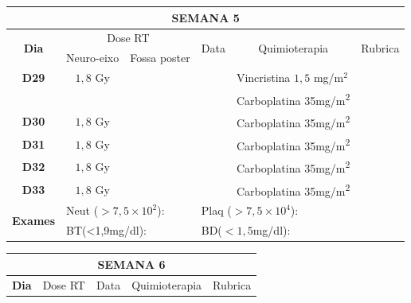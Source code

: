 \documentclass[11pt,a4paper,oldfontcommands]{memoir}
\begin{document}
\begin{center}
\begin{table}[H]
\begin{tabular}{p{1cm}p{2cm}|p{2cm}|p{1cm}|p{4cm}|p{3cm}}
	\hline
	\multicolumn{6}{c}{\textbf{SEMANA 5}}\\
\hline
    \multicolumn{1}{c|}{\multirow{2}{*}{\textbf{Dia}}}&\multicolumn{2}{c|}{Dose RT}&\multicolumn{1}{c|}{\multirow{2}{*}{Data}}&\multicolumn{1}{c|}{\multirow{2}{*}{Quimioterapia}}&\multicolumn{1}{c}{\multirow{2}{*}{Rubrica}} \\
    \cline{2-3}
    \multicolumn{1}{c|}{\multirow{1}{*}{}}&{Neuro-eixo}&{Fossa poster}&& \\
	\hline
	\multicolumn{1}{c|}{\multirow{1}{*}{\textbf{D29}}}&\multicolumn{1}{c|}{\(1,8\) Gy}&&&{Vincristina \(1,5\) mg/m\(^2\)}&\\
	\multicolumn{1}{c|}{\multirow{1}{*}{\textbf{}}}&\multicolumn{1}{c|}{}&&&{Carboplatina 35mg/m\textsuperscript{2}}&\\
    \multicolumn{1}{c|}{\multirow{1}{*}{\textbf{D30}}}&\multicolumn{1}{c|}{\(1,8\) Gy}&&&{Carboplatina 35mg/m\textsuperscript{2}}&\\
    \multicolumn{1}{c|}{\multirow{1}{*}{\textbf{D31}}}&\multicolumn{1}{c|}{\(1,8\) Gy}&&&{Carboplatina 35mg/m\textsuperscript{2}}&\\
    \multicolumn{1}{c|}{\multirow{1}{*}{\textbf{D32}}}&\multicolumn{1}{c|}{\(1,8\) Gy}&&&{Carboplatina 35mg/m\textsuperscript{2}}&\\
    \multicolumn{1}{c|}{\multirow{1}{*}{\textbf{D33}}}&\multicolumn{1}{c|}{\(1,8\) Gy}&&&{Carboplatina 35mg/m\textsuperscript{2}}&\\
    \hline
    \multicolumn{1}{c|}{\multirow{2}{*}{\textbf{Exames}}}&\multicolumn{2}{l|}{Neut (\(>7,5\times10^2\)):}&\multicolumn{2}{l|}{Plaq (\(>7,5\times10^4\)):}&\\
    \cline{2-6}
    \multicolumn{1}{c|}{\multirow{2}{*}{{}}}&\multicolumn{2}{l|}{BT(<1,9mg/dl):}&\multicolumn{2}{l|}{BD(\(<1,5\)mg/dl):}&
    \\
    \hline
\end{tabular}
\end{table}
\begin{table}[H]
\begin{tabular}{p{1cm}p{2cm}|p{2cm}|p{1cm}|p{4cm}|p{3cm}}
	\hline
	\multicolumn{6}{c}{\textbf{SEMANA 6}}\\
\hline
    \multicolumn{1}{c|}{\multirow{2}{*}{\textbf{Dia}}}&\multicolumn{2}{c|}{Dose RT}&\multicolumn{1}{c|}{\multirow{2}{*}{Data}}&\multicolumn{1}{c|}{\multirow{2}{*}{Quimioterapia}}&\multicolumn{1}{c}{\multirow{2}{*}{Rubrica}} \\

\end{tabular}
\end{table}
\end{center}
\end{document}
